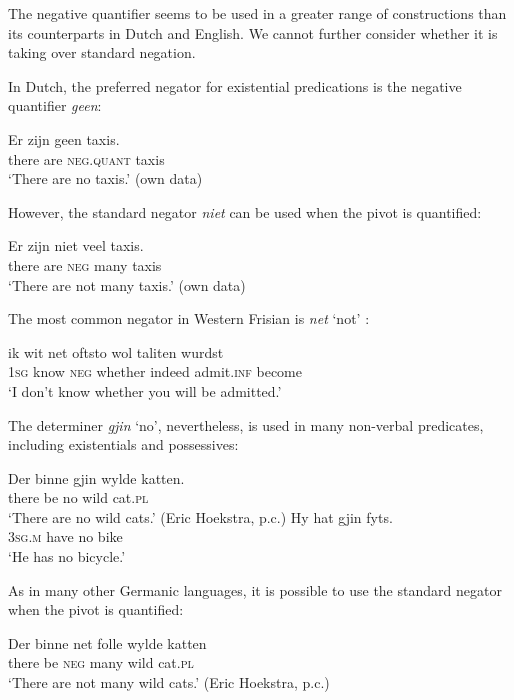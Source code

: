 \documentclass[output=paper,colorlinks,citecolor=brown]{langscibook}
\begin{document}
\begin{paperappendix}
\begin{unindented}
The negative quantifier seems to be used in a greater range of constructions than its counterparts in Dutch and English. We cannot further consider  whether it is taking over standard negation. 


In Dutch, the preferred negator for existential predications is the negative quantifier \textit{geen}: 
%
\begin{exe}\ex
\gll Er zijn geen   taxis. \\
there are \textsc{neg.quant} taxis \\
    \glt `There are no taxis.' (own data)
    \end{exe}

However, the standard negator \textit{niet} can be used when the pivot is quantified:
%
\begin{exe}\ex \gll Er zijn niet  veel   taxis. \\
there are  \textsc{neg} many taxis \\
    \glt `There are not many taxis.' (own data)
    \end{exe}


The most common negator in Western Frisian is \textit{net} `not' \citep[102--103]{Tiersma1999}:
%
\begin{exe}\ex \gll ik wit net  oftsto wol taliten wurdst \\
\textsc{1sg} know \textsc{neg} whether indeed admit.\textsc{inf} become \\
    \glt `I don't know whether you will be admitted.' \citep[91]{Tiersma1999}
    \end{exe}

The determiner \textit{gjin} `no', nevertheless, is used in many non-verbal predicates, including existentials and possessives:
%
\begin{exe}\ex \gll Der binne gjin wylde katten. \\
there be no wild cat.\textsc{pl}
        \\
    \glt `There are no wild cats.' (Eric Hoekstra, p.c.) 
\ex \gll Hy hat gjin fyts. \\
\textsc{3sg.m} have no   bike \\
    \glt `He has no bicycle.' \citep[102]{Tiersma1999}
    \end{exe}

As in many other Germanic languages, it is possible to use the standard negator when the pivot is quantified:
%
\begin{exe}\ex \gll Der   binne net   folle  wylde katten \\
there be \textsc{neg} many wild   cat.\textsc{pl} \\
    \glt `There are not many wild cats.' (Eric Hoekstra, p.c.)
    \end{exe}


\end{unindented}
\end{paperappendix}
\end{document}
